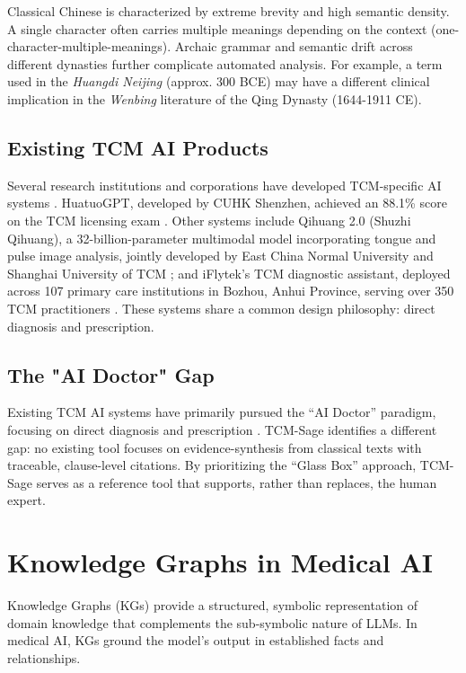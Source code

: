 Classical Chinese is characterized by extreme brevity and high semantic density. A single character often carries multiple meanings depending on the context (one-character-multiple-meanings). Archaic grammar and semantic drift across different dynasties further complicate automated analysis. For example, a term used in the \textit{Huangdi Neijing} (approx. 300 BCE) may have a different clinical implication in the \textit{Wenbing} literature of the Qing Dynasty (1644-1911 CE).

\subsection{Existing TCM AI Products}

Several research institutions and corporations have developed TCM-specific AI systems \cite{wang2026tcmaidev}. HuatuoGPT, developed by CUHK Shenzhen, achieved an 88.1\% score on the TCM licensing exam \cite{huatuogpt2023}. Other systems include Qihuang 2.0 (Shuzhi Qihuang), a 32-billion-parameter multimodal model incorporating tongue and pulse image analysis, jointly developed by East China Normal University and Shanghai University of TCM \cite{qihuang2024ecnu}; and iFlytek's TCM diagnostic assistant, deployed across 107 primary care institutions in Bozhou, Anhui Province, serving over 350 TCM practitioners \cite{iflytek2024cnr}. These systems share a common design philosophy: direct diagnosis and prescription.

\subsection{The "AI Doctor" Gap}

Existing TCM AI systems have primarily pursued the ``AI Doctor'' paradigm, focusing on direct diagnosis and prescription \cite{wang2024tcmai}. TCM-Sage identifies a different gap: no existing tool focuses on evidence-synthesis from classical texts with traceable, clause-level citations. By prioritizing the ``Glass Box'' approach, TCM-Sage serves as a reference tool that supports, rather than replaces, the human expert.


\section{Knowledge Graphs in Medical AI}

Knowledge Graphs (KGs) provide a structured, symbolic representation of domain knowledge that complements the sub-symbolic nature of LLMs. In medical AI, KGs ground the model's output in established facts and relationships.

